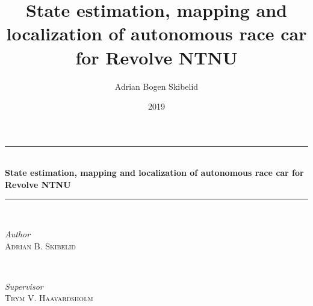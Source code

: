 \documentclass[pdftex,10pt,b5paper,twoside]{book}
\title{State estimation, mapping and localization of autonomous race car for Revolve NTNU}
\author{Adrian Bogen Skibelid}
\date{2019}
\begin{document}
\begin{titlepage} %
	\newcommand{\HRule}{\rule{\linewidth}{0.5mm}} %
	
	\center %
	
	
	
	
	
	
	\HRule\\[0.4cm]
	
	{\huge\bfseries 
	{
	State estimation, mapping and localization of autonomous race car for Revolve NTNU}\\[0.4cm] %
	}
	
	\HRule\\[1.5cm]
	
	
	\begin{minipage}{0.4\textwidth}
		\begin{flushleft}
			\large
			\textit{Author}\\
			\textsc{Adrian B. Skibelid} %
		\end{flushleft}
	\end{minipage}
	~
	\begin{minipage}{0.4\textwidth}
		\begin{flushright}
			\large
			\textit{Supervisor}\\
			\textsc{Trym V. Haavardsholm} %
		\end{flushright}
	\end{minipage}
	
	

\end{titlepage}
\end{document}

